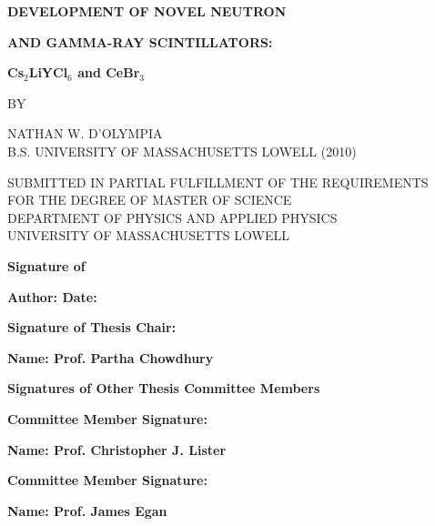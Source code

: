 \begin{center}
\par
\vspace*{0.5in}
{\bf\large DEVELOPMENT OF NOVEL NEUTRON}
\par
\vspace{0.15in}
{\bf\large AND GAMMA-RAY SCINTILLATORS:}
\par
\vspace{0.15in}
{\bf\large Cs$_2$LiYCl$_6$ and CeBr$_3$}
\par
\vspace{0.2in}
{\bf\large }
\par
\vspace{0.6in}
{ BY}
\par
\vspace{0.6in}
{NATHAN W. D'OLYMPIA}\\
{B.S. UNIVERSITY OF MASSACHUSETTS LOWELL (2010)}
\par
\vspace{0.6in}
{SUBMITTED IN PARTIAL FULFILLMENT OF THE REQUIREMENTS}\\
{FOR THE DEGREE OF MASTER OF SCIENCE}\\
{DEPARTMENT OF PHYSICS AND APPLIED PHYSICS}\\
{UNIVERSITY OF MASSACHUSETTS LOWELL}
\end{center}
\par
\vspace{0.6in}
{\bf Signature of}
\par
\vspace{0.15in}
{\bf Author: \underline{\hspace{2.925in}} Date: \underline{\hspace{1.1in}}}
\par
\vspace{0.35in}
{\bf Signature of Thesis Chair: \underline{\hspace{2.64in}}}
\par
\vspace{0.15in}
{\bf Name: Prof. Partha Chowdhury}
\par
\vspace{0.3in}
{\bf Signatures of Other Thesis Committee Members}
\par
\vspace{0.2in}
{\bf Committee Member Signature: \underline{\hspace{2.70in}}}
\par
\vspace{0.15in}
{\bf Name: Prof. Christopher J. Lister}
\par
\vspace{0.2in}
{\bf Committee Member Signature: \underline{\hspace{2.70in}}}
\par
\vspace{0.15in}
{\bf Name: Prof. James Egan}